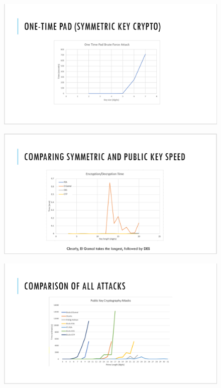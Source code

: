 \documentclass[12pt]{report}
\begin{document}
\begin{figure}[hp!] %
    \begin{center}
        \includegraphics[width=0.85\linewidth]{slide8.PNG}
        \label{fig:slide8}
    \end{center}
\end{figure}

\begin{figure}[hp!] %
    \begin{center}
        \includegraphics[width=0.85\linewidth]{slide9.PNG}
        \label{fig:slide9}
    \end{center}
\end{figure}

\begin{figure}[hp!] %
    \begin{center}
        \includegraphics[width=0.85\linewidth]{slide10.PNG}
        \label{fig:slide10}
    \end{center}
\end{figure}
\end{document}
